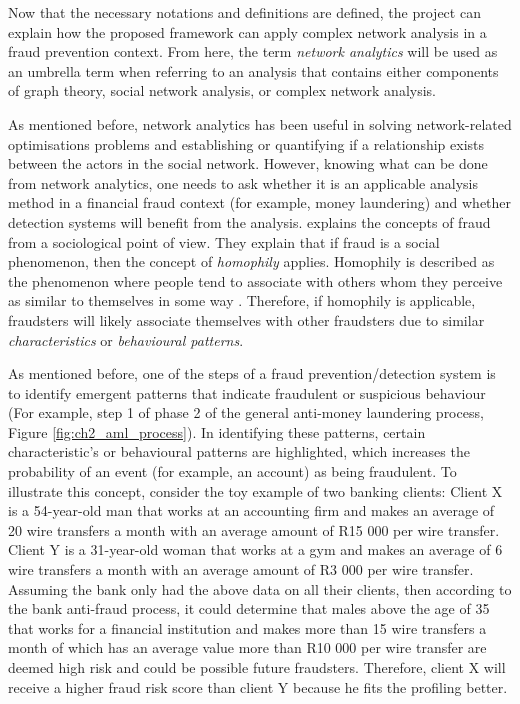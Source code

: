 Now that the necessary notations and definitions are defined, the project can explain how the proposed framework can apply complex network analysis in a fraud prevention context. From here, the term \textit{network analytics} will be used as an umbrella term when referring to an analysis that contains either components of graph theory, social network analysis, or complex network analysis. 

As mentioned before, network analytics has been useful in solving network-related optimisations problems and establishing or quantifying if a relationship exists between the actors in the social network. However, knowing what can be done from network analytics, one needs to ask whether it is an applicable analysis method in a financial fraud context (for example, money laundering) and whether detection systems will benefit from the analysis. \citet{baesens2015fraud} explains the concepts of fraud from a sociological point of view. They explain that if fraud is a social phenomenon, then the concept of \textit{homophily} applies. Homophily is described as the phenomenon where people tend to associate with others whom they perceive as similar to themselves in some way \citep*{newman2018networks}. Therefore, if homophily is applicable, fraudsters will likely associate themselves with other fraudsters due to similar \textit{characteristics} or \textit{behavioural patterns}. 

As mentioned before, one of the steps of a fraud prevention/detection system is to identify emergent patterns that indicate fraudulent or suspicious behaviour (For example, step 1 of phase 2 of the general anti-money laundering process, Figure \ref{fig:ch2_aml_process}). In identifying these patterns, certain characteristic's or behavioural patterns are highlighted, which increases the probability of an event (for example, an account) as being  fraudulent. To illustrate this concept, consider the toy example of two banking clients: Client X is a 54-year-old man that works at an accounting firm and makes an average of 20 wire transfers a month with an average amount of R15 000 per wire transfer. Client Y is a 31-year-old woman that works at a gym and makes an average of 6 wire transfers a month with an average amount of R3 000 per wire transfer. Assuming the bank only had the above data on all their clients, then according to the bank anti-fraud process, it could determine that males above the age of 35 that works for a financial institution and makes more than 15 wire transfers a month of which has an average value more than R10 000 per wire transfer are deemed high risk and could be possible future fraudsters. Therefore, client X will receive a higher fraud risk score than client Y because he fits the profiling better. 

